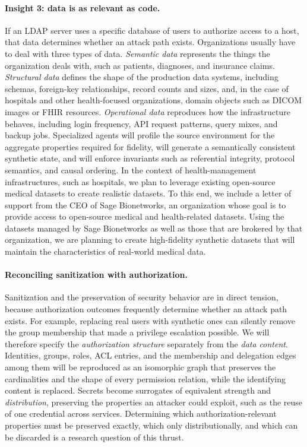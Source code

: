 \paragraph{Insight 3: data is as relevant as code.}
If an LDAP server uses a specific database of users to authorize access to a
host, that data determines whether an attack path exists. Organizations
usually have to deal with three types of data. \emph{Semantic data}
represents the things the organization deals with, such as patients,
diagnoses, and insurance claims. \emph{Structural data} defines the shape of
the production data systems, including schemas, foreign-key relationships,
record counts and sizes, and, in the case of hospitals and other health-focused organizations, domain objects such as DICOM images or FHIR
resources. \emph{Operational data} reproduces how the infrastructure behaves,
including login frequency, API request patterns, query mixes, and backup
jobs. Specialized agents will profile the source environment for the
aggregate properties required for fidelity, will generate a semantically
consistent synthetic state, and will enforce invariants such as referential
integrity, protocol semantics, and causal ordering.
In the context of health-management infrastructures, such as hospitals, we plan to leverage existing open-source medical datasets to create realistic datasets.
To this end, we include a letter of support from the CEO of Sage Bionetworks, an organization whose goal is to provide access to open-source medical and health-related datasets. 
Using the datasets managed by Sage Bionetworks as well as those that are brokered by that organization, we are planning to create high-fidelity synthetic datasets that will maintain the characteristics of real-world medical data.

\paragraph{Reconciling sanitization with authorization.}
Sanitization and the preservation of security behavior are in direct tension,
because authorization outcomes frequently determine whether an attack path
exists. For example, replacing real users with synthetic ones can silently
remove the group membership that made a privilege escalation possible. We
will therefore specify the \emph{authorization structure} separately from the
\emph{data content}. Identities, groups, roles, ACL entries, and the
membership and delegation edges among them will be reproduced as an
isomorphic graph that preserves the cardinalities and the shape of every
permission relation, while the identifying content is replaced. Secrets
become surrogates of equivalent strength and \emph{distribution}, preserving
the properties an attacker could exploit, such as the reuse of one credential
across services. Determining which authorization-relevant
properties must be preserved exactly, which only distributionally, and which
can be discarded is a research question of this thrust.

